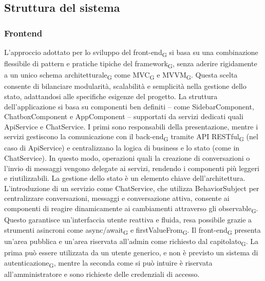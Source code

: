 \subsection{Struttura del sistema}
\subsubsection{Frontend}
L'approccio adottato per lo sviluppo del front-end\textsubscript{G} si basa su una combinazione flessibile di pattern e pratiche tipiche del framework\textsubscript{G}, senza aderire rigidamente a un unico schema architetturale\textsubscript{G} come MVC\textsubscript{G} e MVVM\textsubscript{G}. Questa scelta consente di bilanciare modularità, scalabilità e semplicità nella gestione dello stato, adattandosi alle specifiche esigenze del progetto. La struttura dell'applicazione si basa su componenti ben definiti – come SidebarComponent, ChatboxComponent e AppComponent – supportati da servizi dedicati quali ApiService e ChatService. I primi sono responsabili della presentazione, mentre i servizi gestiscono la comunicazione con il back-end\textsubscript{G} tramite API RESTful\textsubscript{G} (nel caso di ApiService) e centralizzano la logica di business e lo stato (come in ChatService). In questo modo, operazioni quali la creazione di conversazioni o l’invio di messaggi vengono delegate ai servizi, rendendo i componenti più leggeri e riutilizzabili. La gestione dello stato è un elemento chiave dell'architettura. L'introduzione di un servizio come ChatService, che utilizza BehaviorSubject per centralizzare conversazioni, messaggi e conversazione attiva, consente ai componenti di reagire dinamicamente ai cambiamenti attraverso gli observable\textsubscript{G}. Questo garantisce un'interfaccia utente reattiva e fluida, resa possibile grazie a strumenti asincroni come async/await\textsubscript{G} e firstValueFrom\textsubscript{G}.
Il front-end\textsubscript{G} presenta un’area pubblica e un’area riservata all’admin come richiesto dal capitolato\textsubscript{G}. La prima può essere utilizzata da un utente generico, e non è previsto un sistema di autenticazione\textsubscript{G}, mentre la seconda come si può intuire è riservata all’amministratore e sono richieste delle credenziali di accesso.
